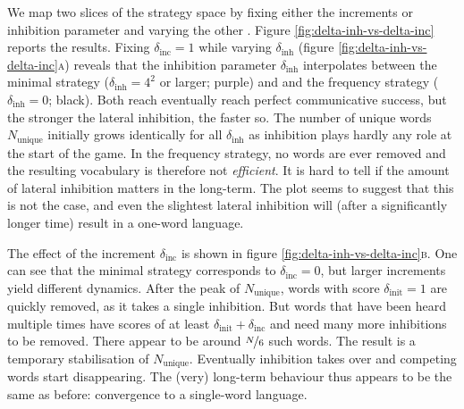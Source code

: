 \documentclass{../src/bcthesispart}
\begin{document}
We map two slices of the strategy space by fixing either the increments or inhibition parameter and varying the other \parencite[following][]{Wellens2012}.
Figure \ref{fig:delta-inh-vs-delta-inc} reports the results.
Fixing $\delta_{\text{inc}} = 1$ while varying $\delta_{\text{inh}}$ (figure \ref{fig:delta-inh-vs-delta-inc}\textsc{a}) reveals that the inhibition parameter $\delta_{\text{inh}}$ interpolates between the minimal strategy ($\delta_{\text{inh}} = 4^2$ or larger; purple) and and the frequency strategy ($\delta_{\text{inh}} = 0$; black).
Both reach eventually reach perfect communicative success, but the stronger the lateral inhibition, the faster so.
The number of unique words $N_{\text{unique}}$ initially grows identically for all $\delta_{\text{inh}}$ as inhibition plays hardly any role at the start of the game.
In the frequency strategy, no words are ever removed and the resulting vocabulary is therefore not \emph{efficient}.
It is hard to tell if the amount of lateral inhibition matters in the long-term. The plot seems to suggest that this is not the case, and even the slightest lateral inhibition will (after a significantly longer time) result in a one-word language.




The effect of the increment $\delta_{\text{inc}}$ is shown in figure \ref{fig:delta-inh-vs-delta-inc}\textsc{b}.
One can see that the minimal strategy corresponds to $\delta_{\text{inc}} = 0$, but larger increments yield different dynamics.
After the peak of $N_{\text{unique}}$, words with score $\delta_{\text{init}} = 1$ are quickly removed, as it takes a single inhibition.
But words that have been heard multiple times have scores of at least $\delta_{\text{init}} + \delta_{\text{inc}}$ and need many more inhibitions to be removed.
There appear to be around $\nicefrac{N}{6}$ such words.
The result is a temporary stabilisation of $N_{\text{unique}}$.
Eventually inhibition takes over and competing words start disappearing. 
The (very) long-term behaviour thus appears to be the same as before: convergence to a single-word language.

%


\showbibliography
\end{document}
